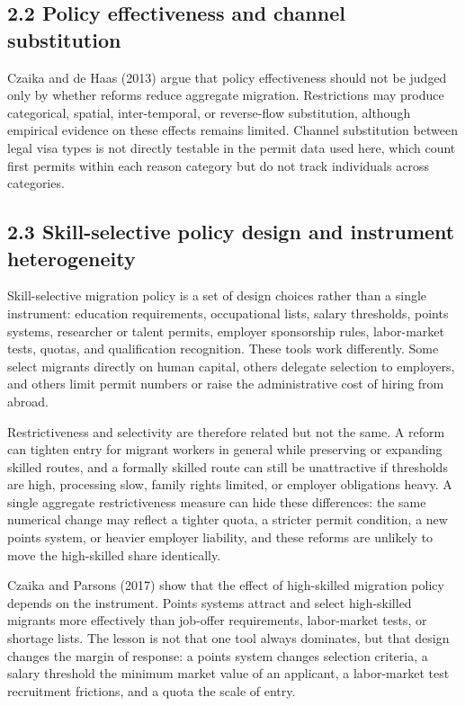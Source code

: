 \documentclass[11pt,a4paper]{article}
\begin{document}
\subsection{2.2 Policy effectiveness and channel
substitution}\label{policy-effectiveness-and-channel-substitution}

Czaika and de Haas (2013) argue that policy effectiveness should not be
judged only by whether reforms reduce aggregate migration. Restrictions
may produce categorical, spatial, inter-temporal, or reverse-flow
substitution, although empirical evidence on these effects remains
limited. Channel substitution between legal visa types is not directly
testable in the permit data used here, which count first permits within
each reason category but do not track individuals across categories.

\subsection{2.3 Skill-selective policy design and instrument
heterogeneity}\label{skill-selective-policy-design-and-instrument-heterogeneity}

Skill-selective migration policy is a set of design choices rather than
a single instrument: education requirements, occupational lists, salary
thresholds, points systems, researcher or talent permits, employer
sponsorship rules, labor-market tests, quotas, and qualification
recognition. These tools work differently. Some select migrants directly
on human capital, others delegate selection to employers, and others
limit permit numbers or raise the administrative cost of hiring from
abroad.

Restrictiveness and selectivity are therefore related but not the same.
A reform can tighten entry for migrant workers in general while
preserving or expanding skilled routes, and a formally skilled route can
still be unattractive if thresholds are high, processing slow, family
rights limited, or employer obligations heavy. A single aggregate
restrictiveness measure can hide these differences: the same numerical
change may reflect a tighter quota, a stricter permit condition, a new
points system, or heavier employer liability, and these reforms are
unlikely to move the high-skilled share identically.

Czaika and Parsons (2017) show that the effect of high-skilled migration
policy depends on the instrument. Points systems attract and select
high-skilled migrants more effectively than job-offer requirements,
labor-market tests, or shortage lists. The lesson is not that one tool
always dominates, but that design changes the margin of response: a
points system changes selection criteria, a salary threshold the minimum
market value of an applicant, a labor-market test recruitment frictions,
and a quota the scale of entry.
\end{document}
